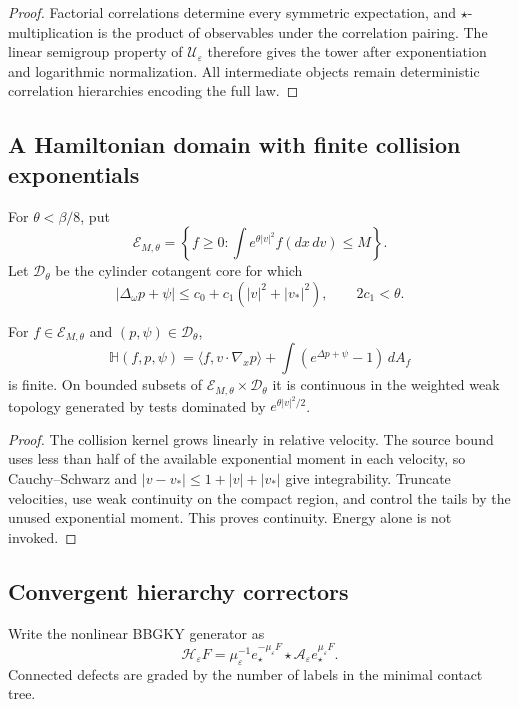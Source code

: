 \begin{proof}
Factorial correlations determine every symmetric expectation, and
\(\star\)-multiplication is the product of observables under the correlation
pairing.  The linear semigroup property of \({\mathscr U}_\varepsilon\)
therefore gives the tower after exponentiation and logarithmic normalization.
All intermediate objects remain deterministic correlation hierarchies
encoding the full law.
\end{proof}

\subsection{A Hamiltonian domain with finite collision exponentials}

For \(\theta<\beta/8\), put
\[
 {\mathcal E}_{M,\theta}
 =
 \left\{f\ge0:
 \int e^{\theta|v|^2}f(dx\,dv)\le M\right\}.
\]
Let \({\mathscr D}_\theta\) be the cylinder cotangent core for which
\[
 |\Delta_\omega p+\psi|
 \le c_0+c_1(|v|^2+|v_*|^2),
 \qquad 2c_1<\theta.
\]

\begin{lemma}
\label{lem:r5-b4-hamiltonian}
For \(f\in{\mathcal E}_{M,\theta}\) and
\((p,\psi)\in{\mathscr D}_\theta\),
\[
 {\mathbb H}(f,p,\psi)
 =
 \langle f,v\cdot\nabla_xp\rangle
 +\int(e^{\Delta p+\psi}-1)\,dA_f
\]
is finite.  On bounded subsets of
\({\mathcal E}_{M,\theta}\times{\mathscr D}_\theta\) it is continuous in the
weighted weak topology generated by tests dominated by
\(e^{\theta|v|^2/2}\).
\end{lemma}

\begin{proof}
The collision kernel grows linearly in relative velocity.  The source bound
uses less than half of the available exponential moment in each velocity, so
Cauchy--Schwarz and
\(|v-v_*|\le1+|v|+|v_*|\) give integrability.  Truncate velocities, use weak
continuity on the compact region, and control the tails by the unused
exponential moment.  This proves continuity.  Energy alone is not invoked.
\end{proof}

\subsection{Convergent hierarchy correctors}

Write the nonlinear BBGKY generator as
\[
 {\mathscr H}_\varepsilon F
 =\mu_\varepsilon^{-1}
 e_\star^{-\mu_\varepsilon F}\star
 {\mathscr A}_\varepsilon
 e_\star^{\mu_\varepsilon F}.
\]
Connected defects are graded by the number of labels in the minimal
contact tree.

